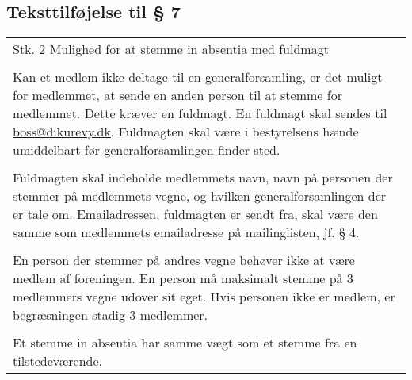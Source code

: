 \documentclass[a4paper,11pt]{report}
\newenvironment{quotationb}%
{\begin{tabular}{|p{10cm}}}%
{\\\end{tabular}}
\begin{document}
\begin{appendices}
\section*{Teksttilføjelse til § 7}
\begin{quotationb}
Stk. 2 Mulighed for at stemme in absentia med fuldmagt\\
\\
Kan et medlem ikke deltage til en generalforsamling, er det muligt for medlemmet,
at sende en anden person til at stemme for medlemmet.  Dette kræver en
fuldmagt.  En fuldmagt skal sendes til \url{boss@dikurevy.dk}.  Fuldmagten skal
være i bestyrelsens hænde umiddelbart før generalforsamlingen finder sted.\\
\\
Fuldmagten skal indeholde medlemmets navn, navn på personen der stemmer på
medlemmets vegne, og hvilken generalforsamlingen der er tale om.  Emailadressen,
fuldmagten er sendt fra, skal være den samme som medlemmets emailadresse på
mailinglisten, jf. § 4.\\
\\
En person der stemmer på andres vegne behøver ikke at være medlem af foreningen.
En person må maksimalt stemme på 3 medlemmers vegne udover sit eget.  Hvis
personen ikke er medlem, er begræsningen stadig 3 medlemmer.\\
\\
Et stemme in absentia har samme vægt som et stemme fra en tilstedeværende.
\end{quotationb}

\end{appendices}
\end{document}
